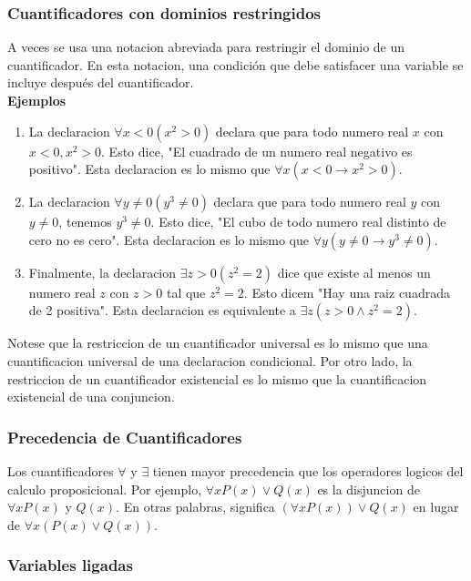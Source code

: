 \documentclass[]{article}
\begin{document}
\subsubsection*{Cuantificadores con dominios restringidos}

A veces se usa una notacion abreviada para restringir el dominio de un cuantificador. En esta notacion, una condición que debe satisfacer una variable se incluye después del cuantificador.\\

\textbf{Ejemplos} 
\begin{enumerate}
	\item La declaracion $\forall x < 0 (x^{2} > 0)$ declara que para todo numero real $x$ con $x < 0, x^{2} > 0$. Esto dice, "El cuadrado de un numero real negativo es positivo". Esta declaracion es lo mismo que $\forall x(x < 0 \rightarrow x^{2} > 0)$.

	\item La declaracion $\forall y \neq 0(y^{3} \neq 0)$ declara que para todo numero real $y$ con $y\neq 0$, tenemos $y^{3} \neq 0$. Esto dice, "El cubo de todo numero real distinto de cero no es cero". Esta declaracion es lo mismo que $\forall y (y \neq 0 \rightarrow y^{3} \neq 0)$.

	\item Finalmente, la declaracion $\exists z > 0 (z^{2} = 2)$ dice que existe al menos un numero real $z$ con $z > 0$ tal que $z^{2} = 2$. Esto dicem "Hay una raiz cuadrada de 2 positiva". Esta declaracion es equivalente a $\exists z(z > 0 \wedge z^{2} = 2)$.
\end{enumerate}

Notese que la restriccion de un cuantificador universal es lo mismo que una cuantificacion universal de una declaracion condicional. Por otro lado, la restriccion de un cuantificador existencial es lo mismo que la cuantificacion existencial de una conjuncion.

\subsubsection*{Precedencia de Cuantificadores}

Los cuantificadores $\forall$ y $\exists$ tienen mayor precedencia que los operadores logicos del calculo proposicional. Por ejemplo, $\forall xP(x) \vee Q(x)$ es la disjuncion de $\forall xP(x)$ y $Q(x)$. En otras palabras, significa $(\forall xP(x)) \vee Q(x)$ en lugar de $\forall x(P(x) \vee Q(x))$.

\subsubsection*{Variables ligadas}
\end{document}
